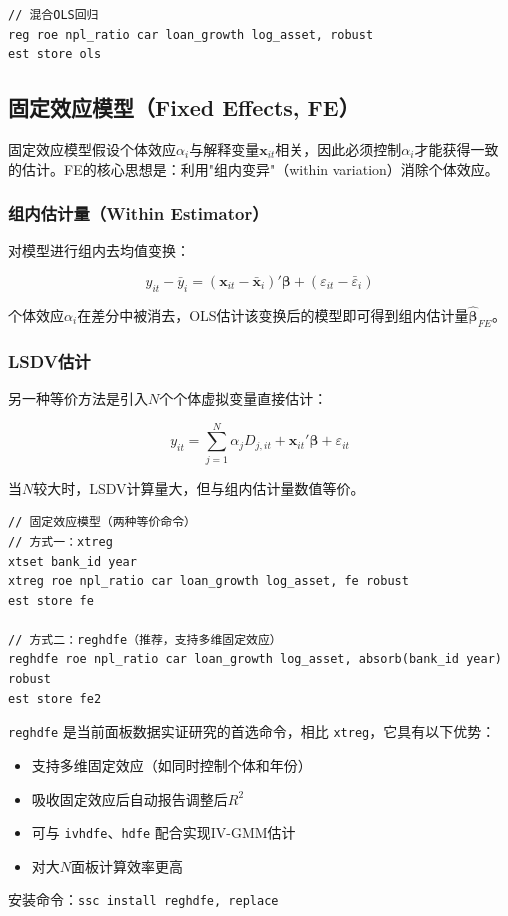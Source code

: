 \begin{lstlisting}[style=stata]
// 混合OLS回归
reg roe npl_ratio car loan_growth log_asset, robust
est store ols
\end{lstlisting}

\subsection{固定效应模型（Fixed Effects, FE）}

固定效应模型假设个体效应$\alpha_i$与解释变量$\mathbf{x}_{it}$相关，因此必须控制$\alpha_i$才能获得一致的估计。FE的核心思想是：利用"组内变异"（within variation）消除个体效应。

\subsubsection{组内估计量（Within Estimator）}

对模型进行组内去均值变换：

\[
y_{it} - \bar{y}_i = (\mathbf{x}_{it} - \bar{\mathbf{x}}_i)'\boldsymbol{\beta} + (\varepsilon_{it} - \bar{\varepsilon}_i)
\]

个体效应$\alpha_i$在差分中被消去，OLS估计该变换后的模型即可得到组内估计量$\hat{\boldsymbol{\beta}}_{FE}$。

\subsubsection{LSDV估计}

另一种等价方法是引入$N$个个体虚拟变量直接估计：

\[
y_{it} = \sum_{j=1}^{N}\alpha_j D_{j,it} + \mathbf{x}_{it}'\boldsymbol{\beta} + \varepsilon_{it}
\]

当$N$较大时，LSDV计算量大，但与组内估计量数值等价。

\begin{lstlisting}[style=stata]
// 固定效应模型（两种等价命令）
// 方式一：xtreg
xtset bank_id year
xtreg roe npl_ratio car loan_growth log_asset, fe robust
est store fe

// 方式二：reghdfe（推荐，支持多维固定效应）
reghdfe roe npl_ratio car loan_growth log_asset, absorb(bank_id year) robust
est store fe2
\end{lstlisting}

\begin{notebox}
\texttt{reghdfe} 是当前面板数据实证研究的首选命令，相比 \texttt{xtreg}，它具有以下优势：
\begin{itemize}
  \item 支持多维固定效应（如同时控制个体和年份）
  \item 吸收固定效应后自动报告调整后$R^2$
  \item 可与 \texttt{ivhdfe}、\texttt{hdfe} 配合实现IV-GMM估计
  \item 对大$N$面板计算效率更高
\end{itemize}
安装命令：\texttt{ssc install reghdfe, replace}
\end{notebox}

